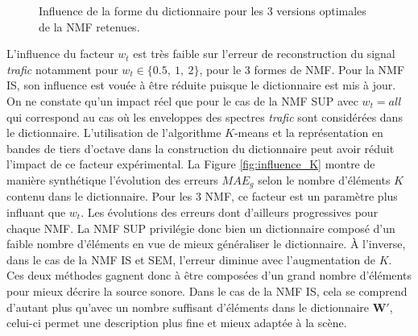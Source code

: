 \begin{figure}[h!]
\centering
{}%
\qquad
{}%
\caption{Influence de la forme du dictionnaire pour les 3 versions optimales de la NMF retenues.}
\label{fig:influence_dict}
\end{figure}


L'influence du facteur $w_t$ est très faible sur l'erreur de reconstruction du signal \textit{trafic} notamment pour $w_t \in \lbrace 0.5,~1,~2\rbrace$, pour le 3 formes de NMF. Pour la NMF IS, son influence est vouée à être réduite puisque le dictionnaire est mis à jour. On ne constate qu'un impact réel que pour le cas de la NMF SUP avec $w_t = all$ qui correspond au cas où les enveloppes des spectres \textit{trafic} sont considérées dans le dictionnaire. L'utilisation de l'algorithme $K$-means et la représentation en bandes de tiers d'octave dans la construction du dictionnaire peut avoir réduit l'impact de ce facteur expérimental.
La Figure \ref{fig:influence_K} montre de manière synthétique l'évolution des erreurs $MAE_g$ selon le nombre d'éléments $K$ contenu dans le dictionnaire.
Pour les 3 NMF, ce facteur est un paramètre plus influant que $w_t$. Les évolutions des erreurs dont d'ailleurs progressives pour chaque NMF.  
La NMF SUP privilégie donc bien un dictionnaire composé d'un faible nombre d'éléments en vue de mieux généraliser le dictionnaire. À l'inverse, dans le cas de la NMF IS et SEM, l'erreur diminue avec l'augmentation de $K$. Ces deux méthodes gagnent donc à être composées d'un grand nombre d'éléments pour mieux décrire la source sonore.
Dans le cas de la NMF IS, cela se comprend d'autant plus qu'avec un nombre suffisant d'éléments dans le dictionnaire $\mathbf{W'}$, celui-ci permet une description plus fine et mieux adaptée à la scène.

